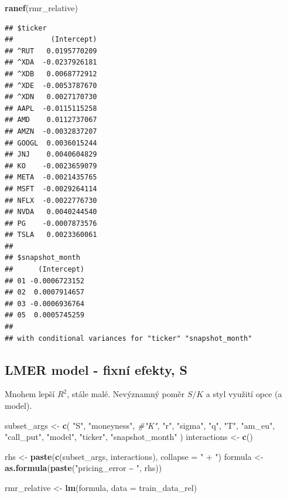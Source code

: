 \documentclass[
]{article}
\newenvironment{Shaded}{\begin{snugshade}}{\end{snugshade}}
\newcommand{\AttributeTok}[1]{\textcolor[rgb]{0.13,0.29,0.53}{#1}}
\newcommand{\CommentTok}[1]{\textcolor[rgb]{0.56,0.35,0.01}{\textit{#1}}}
\newcommand{\FunctionTok}[1]{\textcolor[rgb]{0.13,0.29,0.53}{\textbf{#1}}}
\newcommand{\NormalTok}[1]{#1}
\newcommand{\OtherTok}[1]{\textcolor[rgb]{0.56,0.35,0.01}{#1}}
\newcommand{\StringTok}[1]{\textcolor[rgb]{0.31,0.60,0.02}{#1}}
\begin{document}
\begin{Shaded}
\begin{Highlighting}[]
\FunctionTok{ranef}\NormalTok{(rmr\_relative)}
\end{Highlighting}
\end{Shaded}

\begin{verbatim}
## $ticker
##         (Intercept)
## ^RUT   0.0195770209
## ^XDA  -0.0237926181
## ^XDB   0.0068772912
## ^XDE  -0.0053787670
## ^XDN   0.0027170730
## AAPL  -0.0115115258
## AMD    0.0112737067
## AMZN  -0.0032837207
## GOOGL  0.0036015244
## JNJ    0.0040604829
## KO    -0.0023659079
## META  -0.0021435765
## MSFT  -0.0029264114
## NFLX  -0.0022776730
## NVDA   0.0040244540
## PG    -0.0007873576
## TSLA   0.0023360061
## 
## $snapshot_month
##      (Intercept)
## 01 -0.0006723152
## 02  0.0007914657
## 03 -0.0006936764
## 05  0.0005745259
## 
## with conditional variances for "ticker" "snapshot_month"
\end{verbatim}

\subsection{LMER model - fixní efekty,
S}\label{lmer-model---fixnuxed-efekty-s}

Mnohem lepší \(R^2\), stále malé. Nevýznamný poměr \(S/K\) a styl
využití opce (a model).

\begin{Shaded}
\begin{Highlighting}[]
\NormalTok{subset\_args }\OtherTok{\textless{}{-}} \FunctionTok{c}\NormalTok{(}
  \StringTok{"S"}\NormalTok{,}
  \StringTok{"moneyness"}\NormalTok{,}
  \CommentTok{\#"K",}
  \StringTok{"r"}\NormalTok{,}
  \StringTok{"sigma"}\NormalTok{,}
  \StringTok{"q"}\NormalTok{,}
  \StringTok{"T"}\NormalTok{,}
  \StringTok{"am\_eu"}\NormalTok{,}
  \StringTok{"call\_put"}\NormalTok{,}
  \StringTok{"model"}\NormalTok{,}
  \StringTok{"ticker"}\NormalTok{,}
  \StringTok{"snapshot\_month"}
\NormalTok{)}
\NormalTok{interactions }\OtherTok{\textless{}{-}} \FunctionTok{c}\NormalTok{()}

\NormalTok{rhs }\OtherTok{\textless{}{-}} \FunctionTok{paste}\NormalTok{(}\FunctionTok{c}\NormalTok{(subset\_args, interactions), }\AttributeTok{collapse =} \StringTok{" + "}\NormalTok{)}
\NormalTok{formula }\OtherTok{\textless{}{-}} \FunctionTok{as.formula}\NormalTok{(}\FunctionTok{paste}\NormalTok{(}\StringTok{"pricing\_error \textasciitilde{} "}\NormalTok{, rhs))}

\NormalTok{rmr\_relative }\OtherTok{\textless{}{-}} \FunctionTok{lm}\NormalTok{(formula, }\AttributeTok{data =}\NormalTok{ train\_data\_rel)}
\end{Highlighting}
\end{Shaded}
\end{document}

